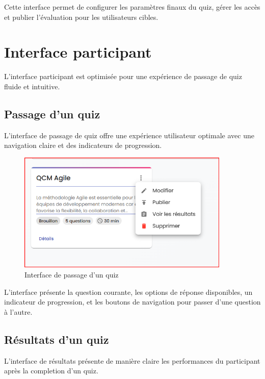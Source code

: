 \documentclass[12pt,a4paper]{report}
\begin{document}
Cette interface permet de configurer les paramètres finaux du quiz, gérer les accès et publier l'évaluation pour les utilisateurs cibles.

\section{Interface participant}

L'interface participant est optimisée pour une expérience de passage de quiz fluide et intuitive.

\subsection{Passage d'un quiz}

L'interface de passage de quiz offre une expérience utilisateur optimale avec une navigation claire et des indicateurs de progression.

\begin{figure}[H]
\centering
\includegraphics[width=0.9\textwidth]{latex_media/media/image59.png}
\caption{Interface de passage d'un quiz}
\label{fig:passage-quiz}
\end{figure}

L'interface présente la question courante, les options de réponse disponibles, un indicateur de progression, et les boutons de navigation pour passer d'une question à l'autre.

\subsection{Résultats d'un quiz}

L'interface de résultats présente de manière claire les performances du participant après la completion d'un quiz.
\end{document}

